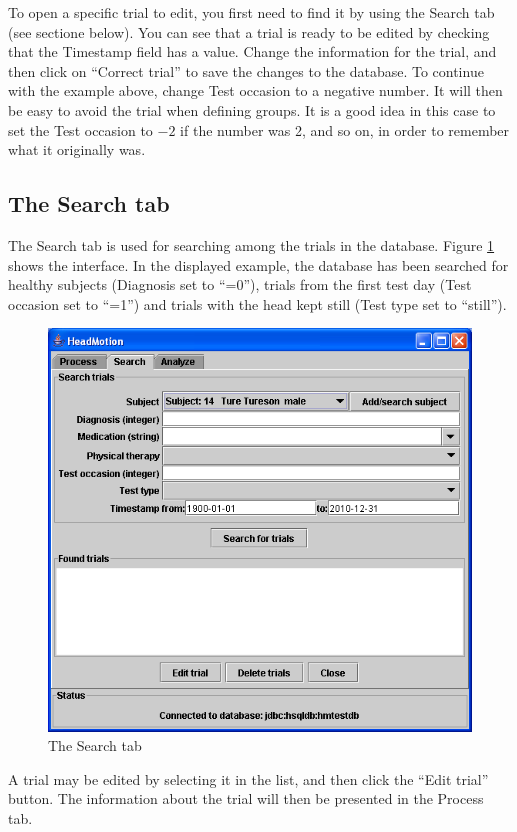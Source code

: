 \documentclass[a4paper,11pt]{article}
\begin{document}
To open a specific trial to edit, you first need to find it by using
the Search tab (see sectione below). You can see that a trial is ready
to be edited by checking that the Timestamp field has a value. Change
the information for the trial, and then click on ``Correct trial'' to
save the changes to the database. To continue with the example above,
change Test occasion to a negative number. It will then be easy to
avoid the trial when defining groups. It is a good idea in this case
to set the Test occasion to $-2$ if the number was 2, and so on, in
order to remember what it originally was.

\subsection{The Search tab}
The Search tab is used for searching among the trials in the
database. Figure \ref{fig:searchgui} shows the interface. In the
displayed example, the database has been searched for healthy subjects
(Diagnosis set to ``=0''), trials from the first test day (Test
occasion set to ``=1'') and trials with the head kept still (Test type
set to ``still''). 
  \begin{figure}[htbp]
    \centering
    \includegraphics[width=120mm]{figures/searchgui.png}
    \caption{The Search tab}
    \label{fig:searchgui}
  \end{figure}

A trial may be edited by selecting it in the list, and then click the
``Edit trial'' button. The information about the trial will then be
presented in the Process tab.
\end{document}
